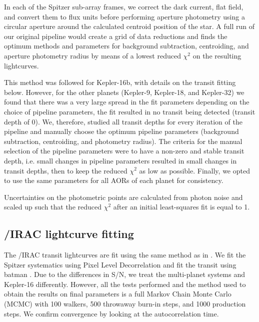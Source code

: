 In each of the Spitzer sub-array frames, we correct the dark current, flat field, and convert them to flux units before performing aperture photometry using a circular aperture around the calculated centroid position of the star. A full run of our original pipeline would create a grid of data reductions and finds the optimum methods and parameters for background subtraction, centroiding, and aperture photometry radius by means of a lowest reduced $\chi^2$ on the resulting lightcurves.

This method was followed for Kepler-16b, with details on the transit fitting below. However, for the other planets (Kepler-9, Kepler-18, and Kepler-32) we found that there was a very large spread in the fit parameters depending on the choice of pipeline parameters, the fit resulted in no transit being detected (transit depth of 0). We, therefore, studied all transit depths for every iteration of the pipeline and manually choose the optimum pipeline parameters (background subtraction, centroiding, and photometry radius). The criteria for the manual selection of the pipeline parameters were to have a non-zero and stable transit depth, i.e. small changes in pipeline parameters resulted in small changes in transit depths, then to keep the reduced $\chi^2$ as low as possible. Finally, we opted to use the same parameters for all AORs of each planet for consistency.


Uncertainties on the photometric points are calculated from photon noise and scaled up such that the reduced $\chi^2$ after an initial least-squares fit is equal to 1.

\subsection{\spitzer/IRAC lightcurve fitting}

The \spitzer/IRAC transit lightcurves are fit using the same method as in \citet{Baxter2021}. We fit the Spitzer systematics using Pixel Level Decorrelation \citep{Deming2015} and fit the transit using batman \citep{Kreidberg2015}. Due to the differences in S/N, we treat the multi-planet systems and Kepler-16 differently. However, all the tests performed and the method used to obtain the results on final parameters is a full Markov Chain Monte Carlo (MCMC) with 100 walkers, 500 throwaway burn-in steps, and 1000 production steps. We confirm convergence by looking at the autocorrelation time.

